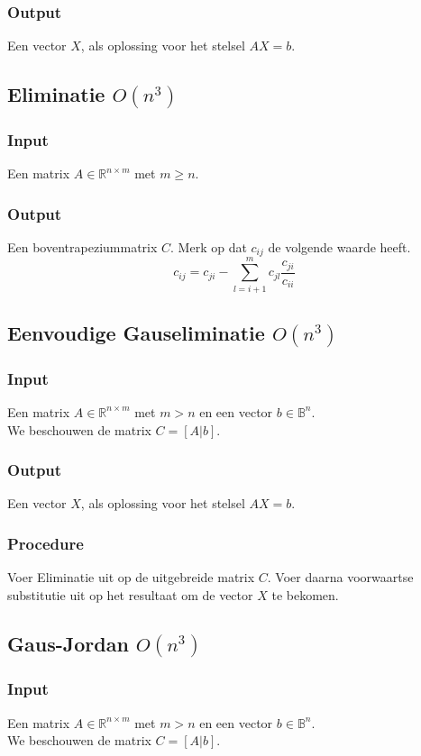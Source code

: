 \documentclass[samenvatting.tex]{subfiles}
\begin{document}
\subsubsection*{Output}
Een vector $X$, als oplossing voor het stelsel $AX=b$.

\subsection{Eliminatie $O(n^3)$}
\subsubsection*{Input}
Een matrix $A \in \mathbb{R}^{n\times m}$ met $m \ge n$.
\subsubsection*{Output}
Een boventrapeziummatrix $C$.
Merk op dat $c_{ij}$ de volgende waarde heeft.
\[
c_{ij} = c_{ji} - \sum_{l=i+1}^m c_{jl}\frac{c_{ji}}{c_{ii}}
\]

\subsection{Eenvoudige Gauseliminatie $O(n^3)$}
\subsubsection*{Input}
Een matrix $A \in \mathbb{R}^{n\times m}$ met $m>n$ en een vector $b \in \mathbb{B}^{n}$.\\
We beschouwen de matrix $C = [A|b]$.
\subsubsection*{Output}
Een vector $X$, als oplossing voor het stelsel $AX=b$.
\subsubsection*{Procedure}
Voer Eliminatie uit op de uitgebreide matrix $C$. Voer daarna voorwaartse substitutie uit op het resultaat om de vector $X$ te bekomen.

\subsection{Gaus-Jordan $O(n^3)$}
\subsubsection*{Input}
Een matrix $A \in \mathbb{R}^{n\times m}$ met $m>n$ en een vector $b \in \mathbb{B}^{n}$.\\
We beschouwen de matrix $C = [A|b]$.
\end{document}
